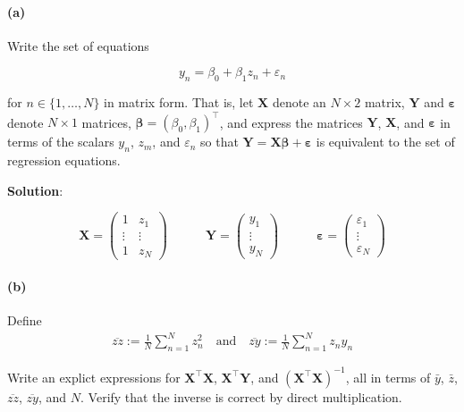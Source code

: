 \documentclass[
  letterpaper,
  DIV=11,
  numbers=noendperiod]{scrartcl}
\let\oldparagraph\paragraph
\renewcommand{\paragraph}[1]{\oldparagraph{#1}\mbox{}}
\begin{document}
\hypertarget{a}{%
\paragraph{(a)}\label{a}}

Write the set of equations

\[
y_n = \beta_0 + \beta_1 z_n + \varepsilon_n
\]

for \(n \in \{1, \ldots, N\}\) in matrix form. That is, let
\(\boldsymbol{X}\) denote an \(N \times 2\) matrix, \(\boldsymbol{Y}\)
and \(\boldsymbol{\varepsilon}\) denote \(N \times 1\) matrices,
\(\boldsymbol{\beta}= (\beta_0, \beta_1)^\intercal\), and express the
matrices \(\boldsymbol{Y}\), \(\boldsymbol{X}\), and
\(\boldsymbol{\varepsilon}\) in terms of the scalars \(y_n\), \(z_m\),
and \(\varepsilon_n\) so that
\(\boldsymbol{Y}= \boldsymbol{X}\boldsymbol{\beta}+ \boldsymbol{\varepsilon}\)
is equivalent to the set of regression equations.

\textbf{Solution}:

\[
\boldsymbol{X}=
\begin{pmatrix}
1 & z_1 \\
\vdots & \vdots \\
1 & z_N 
\end{pmatrix}
\quad\quad\quad
\boldsymbol{Y}= \begin{pmatrix}
y_1 \\
\vdots \\
y_N
\end{pmatrix}
\quad\quad\quad
\boldsymbol{\varepsilon}= \begin{pmatrix}
\varepsilon_1 \\
\vdots \\
\varepsilon_N
\end{pmatrix}
\]

\hypertarget{b}{%
\paragraph{(b)}\label{b}}

Define \[
\begin{aligned}
    \overline{zz} := \frac{1}{N} \sum_{n=1}^Nz_n^2
    \quad\textrm{and}\quad
    \overline{zy} := \frac{1}{N} \sum_{n=1}^Nz_n y_n
\end{aligned}
\]

Write an explict expressions for
\(\boldsymbol{X}^\intercal\boldsymbol{X}\),
\(\boldsymbol{X}^\intercal\boldsymbol{Y}\), and
\(\left(\boldsymbol{X}^\intercal\boldsymbol{X}\right)^{-1}\), all in
terms of \(\bar{y}\), \(\bar{z}\), \(\overline{zz}\), \(\overline{zy}\),
and \(N\). Verify that the inverse is correct by direct multiplication.
\end{document}
